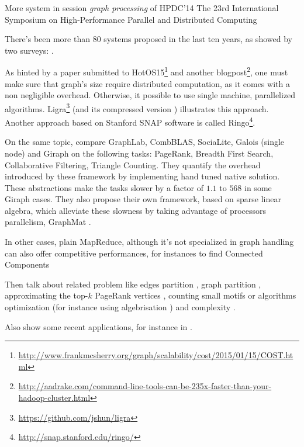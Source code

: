 More system in session \emph{graph processing} of HPDC'14 The 23rd International
Symposium on High-Performance Parallel and Distributed Computing 

There's been more than 80 systems proposed in the last ten years, as showed by
two surveys: \autocites{Doekemeijer2014}{McCune2015}.

As hinted by a paper submitted to
HotOS15\footnote{\href{http://www.frankmcsherry.org/graph/scalability/cost/2015/01/15/COST.html}%
	{http://www.frankmcsherry.org/graph/scalability/cost/2015/01/15/COST.html}}
and another
blogpost\footnote{\href{http://aadrake.com/command-line-tools-can-be-235x-faster-than-your-hadoop-cluster.html}%
	{http://aadrake.com/command-line-tools-can-be-235x-faster-than-your-hadoop-cluster.html}},
one must make sure that graph's size require distributed computation, as it
comes with a non negligible overhead. Otherwise, it possible to use single
machine, parallelized algorithms.
Ligra\footnote{\href{https://github.com/jshun/ligra}%
	{https://github.com/jshun/ligra}} \autocite{Ligra13} (and its compressed
version \autocite{Ligra15}) illustrates this approach. Another approach based
on Stanford SNAP software is called Ringo\footnote{\href{http://snap.stanford.edu/ringo/}%
	{http://snap.stanford.edu/ringo/}}\autocite{Ringo15}.

On the same topic, \textcite{NativeBenchmark14} compare GraphLab, CombBLAS,
SociaLite, Galois (single node) and Giraph on the following tasks: PageRank,
Breadth First Search, Collaborative Filtering, Triangle Counting. They quantify
the overhead introduced by these framework by implementing hand tuned native
solution. These abstractions make the tasks slower by a factor of $1.1$ to
$568$ in some Giraph cases. They also propose their own framework, based on
sparse linear algebra, which alleviate these slowness by taking advantage of
processors parallelism, GraphMat \autocite{GraphMat15}.

In other cases, plain MapReduce\autocite{MapReduce04}, although it's not
specialized in graph handling can also offer competitive performances, for
instances to find Connected Components
\autocites{Kardes2014}{Qin2014}{Kiveris2014}

Then talk about related problem like edges partition \autocite{Bourse2014a},
graph partition \autocites{Partition13}{Tsourakakis2014}{Partition14}{Li2015a},
approximating the top-$k$ PageRank vertices \autocite{Mitliagkas2015},
counting small motifs \autocite{Elenberg2015} or
algorithms optimization \autocites{Salihoglu14}{Salihoglu2014b} (for instance
using algebrisation \autocite{Kaski2015}) and complexity
\autocite{ComputationBounds14,Pandurangan2015}.

Also show some recent applications, for instance in \pcc{}
\autocites{Bonchi2012}{Chierichetti2014}.
\autocite{Quick2012}

